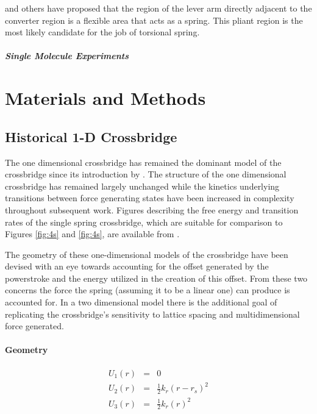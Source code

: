 \documentclass[]{article}
\begin{document}
\cite{Houdusse:2001:p182} and others have proposed that the region of the lever arm directly adjacent to the converter region is a flexible area that acts as a spring. This pliant region is the most likely candidate for the job of torsional spring. 



\subparagraph*{Single Molecule Experiments}



\section*{Materials and Methods}


\subsection*{Historical 1-D Crossbridge}

The one dimensional crossbridge has remained the dominant model of the crossbridge since its introduction by \citet{Huxley1957e}. The structure of the one dimensional crossbridge has remained largely unchanged while the kinetics underlying transitions between force generating states have been increased in complexity throughout subsequent work. \citep{PateCooke1988, Daniel1998a,Chase2004a,Tanner2007a}
Figures describing the free energy and transition rates of the single spring crossbridge, which are suitable for comparison to Figures \ref{fig:4s} and \ref{fig:4s}, are available from \citet{Tanner2007a}.

The geometry of these one-dimensional models of the crossbridge have been devised with an eye towards accounting for the offset generated by the powerstroke and the energy utilized in the creation of this offset. 
From these two concerns the force the spring (assuming it to be a linear one) can produce is accounted for. 
In a two dimensional model there is the additional goal of replicating the crossbridge's sensitivity to lattice spacing and multidimensional force generated. 

\paragraph*{Geometry}


\begin{eqnarray}
\label{1sEnergy}
    U_1(r) & = & 0 \nonumber \\
    U_2(r) & = & \frac{1}{2}k_r (r-r_s)^2 \nonumber \\
    U_3(r) & = & \frac{1}{2}k_r (r)^2 \\
\end{eqnarray}
\end{document}
